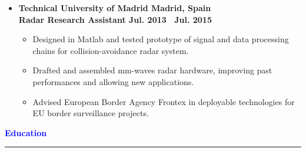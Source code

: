 \documentclass[10pt, letterpaper]{letter}
\begin{document}
\begin{itemize}[label=$\bullet$, leftmargin=1em]
\vfill

    \item
    \textbf{Technical University of Madrid \hfill Madrid, Spain}\vspace{2pt}\\
    \textbf{Radar Research Assistant \hfill Jul. 2013 \textendash\ Jul. 2015}\vspace{2pt}
    \begin{itemize}[nosep, leftmargin=1.15em]
	\item Designed in Matlab and tested prototype of signal and data processing chains for collision-avoidance radar system.
	\item Drafted and assembled mm-waves radar hardware, improving past performances and allowing new applications.
        \item Advised European Border Agency Frontex in deployable technologies for EU border surveillance projects.
    \end{itemize}

\end{itemize}

\vfill


\textcolor{Blue}{
    \large\textbf{Education}
    \vspace{3pt}
    \hrule height 1.5pt
}
\end{document}
